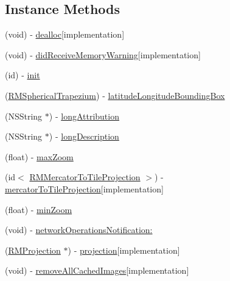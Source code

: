 \subsection*{Instance Methods}
\begin{DoxyCompactItemize}
\item 
(void) -\/ \hyperlink{interface_r_m_abstract_mercator_web_source_a24301a2a9dd3c5839d0884251713c2e5}{dealloc}{\ttfamily  \mbox{[}implementation\mbox{]}}
\item 
(void) -\/ \hyperlink{interface_r_m_abstract_mercator_web_source_a560d3138401fbe5b7f8f7f358cf2e11b}{did\-Receive\-Memory\-Warning}{\ttfamily  \mbox{[}implementation\mbox{]}}
\item 
(id) -\/ \hyperlink{interface_r_m_abstract_mercator_web_source_a88bc1ea00a789381d77ae50e0eaec732}{init}
\item 
(\hyperlink{struct_r_m_spherical_trapezium}{R\-M\-Spherical\-Trapezium}) -\/ \hyperlink{interface_r_m_abstract_mercator_web_source_ae43425d7f2ade06fd2e3bdf34a8b083a}{latitude\-Longitude\-Bounding\-Box}
\item 
(N\-S\-String $\ast$) -\/ \hyperlink{interface_r_m_abstract_mercator_web_source_a77313c2d697428dd994a6e0cf07a256f}{long\-Attribution}
\item 
(N\-S\-String $\ast$) -\/ \hyperlink{interface_r_m_abstract_mercator_web_source_a9c1c86280c6fa05e4e82502822fcfd10}{long\-Description}
\item 
(float) -\/ \hyperlink{interface_r_m_abstract_mercator_web_source_a95d5287d9e661ba2e6c319fe9615c703}{max\-Zoom}
\item 
(id$<$ \hyperlink{protocol_r_m_mercator_to_tile_projection-p}{R\-M\-Mercator\-To\-Tile\-Projection} $>$) -\/ \hyperlink{interface_r_m_abstract_mercator_web_source_af48c0466d8040638076c5093f8b8234a}{mercator\-To\-Tile\-Projection}{\ttfamily  \mbox{[}implementation\mbox{]}}
\item 
(float) -\/ \hyperlink{interface_r_m_abstract_mercator_web_source_ae2767e8347256d6cc5eb88aec30fd97c}{min\-Zoom}
\item 
(void) -\/ \hyperlink{interface_r_m_abstract_mercator_web_source_ac370abc5403c594edcd8f6a59ab8907e}{network\-Operations\-Notification\-:}
\item 
(\hyperlink{interface_r_m_projection}{R\-M\-Projection} $\ast$) -\/ \hyperlink{interface_r_m_abstract_mercator_web_source_a7f9e2c871a2842dd854324fc173cd47f}{projection}{\ttfamily  \mbox{[}implementation\mbox{]}}
\item 
(void) -\/ \hyperlink{interface_r_m_abstract_mercator_web_source_a0d60c497c08e580f50acba5cb922fd97}{remove\-All\-Cached\-Images}{\ttfamily  \mbox{[}implementation\mbox{]}}

\end{DoxyCompactItemize}
